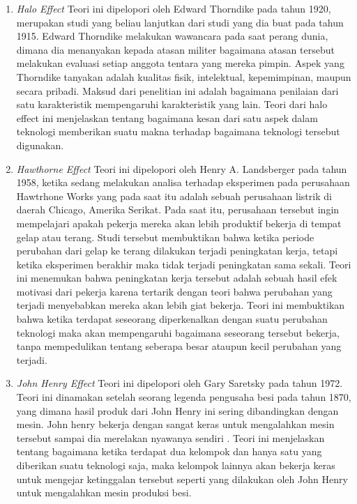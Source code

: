 	\begin{enumerate}
		\item \textit{Halo Effect}
			\subitem Teori ini dipelopori oleh Edward Thorndike pada tahun 1920, merupakan studi yang beliau lanjutkan dari studi yang dia buat pada tahun 1915. Edward Thorndike melakukan wawancara pada saat perang dunia, dimana dia menanyakan kepada atasan militer bagaimana atasan tersebut melakukan evaluasi setiap anggota tentara yang mereka pimpin. Aspek yang Thorndike tanyakan adalah kualitas fisik, intelektual, kepemimpinan, maupun secara pribadi. Maksud dari penelitian ini adalah bagaimana penilaian dari satu karakteristik mempengaruhi karakteristik yang lain. Teori dari halo effect ini menjelaskan tentang bagaimana kesan dari satu aspek dalam teknologi memberikan suatu makna terhadap bagaimana teknologi tersebut digunakan.
		\item \textit{Hawthorne Effect}
			\subitem Teori ini dipelopori oleh Henry A. Landsberger pada tahun 1958, ketika sedang melakukan analisa terhadap eksperimen pada perusahaan Hawtrhone Works yang pada saat itu adalah sebuah perusahaan listrik di daerah Chicago, Amerika Serikat. Pada saat itu, perusahaan tersebut ingin mempelajari apakah pekerja mereka akan lebih produktif bekerja di tempat gelap atau terang. Studi tersebut membuktikan bahwa ketika periode perubahan dari gelap ke terang dilakukan terjadi peningkatan kerja, tetapi ketika eksperimen berakhir maka tidak terjadi peningkatan sama sekali. Teori ini menemukan bahwa peningkatan kerja tersebut adalah sebuah hasil efek motivasi dari pekerja karena tertarik dengan teori bahwa perubahan yang terjadi menyebabkan mereka akan lebih giat bekerja. Teori ini membuktikan bahwa ketika terdapat seseorang diperkenalkan dengan suatu perubahan teknologi maka akan mempengaruhi bagaimana seseorang tersebut bekerja, tanpa mempedulikan tentang seberapa besar ataupun kecil perubahan yang terjadi.
		\item \textit{John Henry Effect}
			\subitem Teori ini dipelopori oleh Gary Saretsky pada tahun 1972. Teori ini dinamakan setelah seorang legenda pengusaha besi pada tahun 1870, yang dimana hasil produk dari John Henry ini sering dibandingkan dengan mesin. John henry bekerja dengan sangat keras untuk mengalahkan mesin tersebut sampai dia merelakan nyawanya sendiri . Teori ini menjelaskan tentang bagaimana ketika terdapat dua kelompok dan hanya satu yang diberikan suatu teknologi saja, maka kelompok lainnya akan bekerja keras untuk mengejar ketinggalan tersebut seperti yang dilakukan oleh John Henry untuk mengalahkan mesin produksi besi.
	\end{enumerate}
